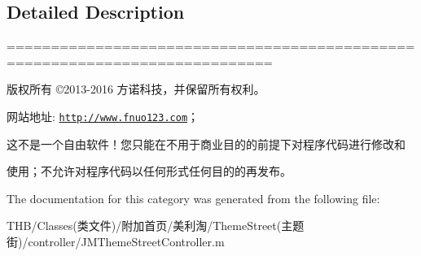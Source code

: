 \subsection{Detailed Description}
============================================================================

版权所有 ©2013-\/2016 方诺科技，并保留所有权利。

网站地址\+: \href{http://www.fnuo123.com}{\tt http\+://www.\+fnuo123.\+com}； 



这不是一个自由软件！您只能在不用于商业目的的前提下对程序代码进行修改和

使用；不允许对程序代码以任何形式任何目的的再发布。 

 

The documentation for this category was generated from the following file\+:\begin{DoxyCompactItemize}
\item 
T\+H\+B/\+Classes(类文件)/附加首页/美利淘/\+Theme\+Street(主题街)/controller/J\+M\+Theme\+Street\+Controller.\+m\end{DoxyCompactItemize}
